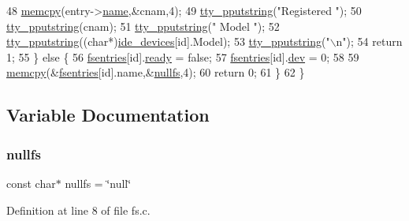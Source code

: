\begin{DoxyCode}
48         \hyperlink{a00110_a370712322c794e949c996946f2283ea8_a370712322c794e949c996946f2283ea8}{memcpy}(entry->\hyperlink{a00226_a9c5a4f5b02eb2c9e9e797f79dc99028a_a9c5a4f5b02eb2c9e9e797f79dc99028a}{name},&cnam,4);
49         \hyperlink{a00140_ade960b1320324706aac6c00cc6b1b2fe_ade960b1320324706aac6c00cc6b1b2fe}{tty\_pputstring}(\textcolor{stringliteral}{"Registered "});
50         \hyperlink{a00140_ade960b1320324706aac6c00cc6b1b2fe_ade960b1320324706aac6c00cc6b1b2fe}{tty\_pputstring}(cnam);
51         \hyperlink{a00140_ade960b1320324706aac6c00cc6b1b2fe_ade960b1320324706aac6c00cc6b1b2fe}{tty\_pputstring}(\textcolor{stringliteral}{" Model "});
52         \hyperlink{a00140_ade960b1320324706aac6c00cc6b1b2fe_ade960b1320324706aac6c00cc6b1b2fe}{tty\_pputstring}((\textcolor{keywordtype}{char}*)\hyperlink{a00026_ab97a828ed4839b575dc382e2bf826e87_ab97a828ed4839b575dc382e2bf826e87}{ide\_devices}[\textcolor{keywordtype}{id}].Model);
53         \hyperlink{a00140_ade960b1320324706aac6c00cc6b1b2fe_ade960b1320324706aac6c00cc6b1b2fe}{tty\_pputstring}(\textcolor{stringliteral}{"\(\backslash\)n"});
54         \textcolor{keywordflow}{return} 1;
55     \} \textcolor{keywordflow}{else} \{
56         \hyperlink{a00128_a6b46131164b26e476762930c9aae4319_a6b46131164b26e476762930c9aae4319}{fsentries}[id].\hyperlink{a00226_a284522ed97fe1eeebd0fcc039b2ea00a_a284522ed97fe1eeebd0fcc039b2ea00a}{ready} = \textcolor{keyword}{false};
57         \hyperlink{a00128_a6b46131164b26e476762930c9aae4319_a6b46131164b26e476762930c9aae4319}{fsentries}[id].\hyperlink{a00226_aaea66ea744fa50f1c54666033884d8d2_aaea66ea744fa50f1c54666033884d8d2}{dev} = 0;
58 
59         \hyperlink{a00110_a370712322c794e949c996946f2283ea8_a370712322c794e949c996946f2283ea8}{memcpy}(&\hyperlink{a00128_a6b46131164b26e476762930c9aae4319_a6b46131164b26e476762930c9aae4319}{fsentries}[\textcolor{keywordtype}{id}].name,&\hyperlink{a00125_a36265ac74fd925405e1179e799961f1e_a36265ac74fd925405e1179e799961f1e}{nullfs},4);
60         \textcolor{keywordflow}{return} 0;
61     \} 
62 \}
\end{DoxyCode}


\subsection{Variable Documentation}
\mbox{\label{a00125_a36265ac74fd925405e1179e799961f1e_a36265ac74fd925405e1179e799961f1e}} 
\subsubsection{\texorpdfstring{nullfs}{nullfs}}
{\footnotesize\ttfamily const char$\ast$ nullfs = \char`\"{}null\char`\"{}}



Definition at line 8 of file fs.\+c.

